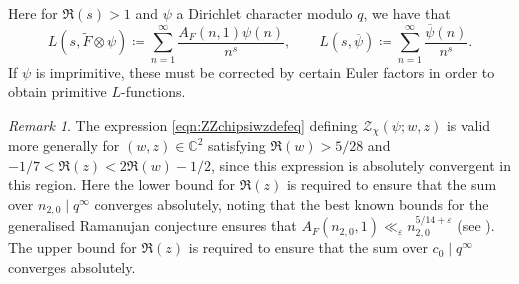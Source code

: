 \documentclass[11pt,a4paper]{amsart}
\newcommand{\C}{\mathbb{C}}
\newcommand{\e}{\varepsilon}
\newcommand{\ZZ}{\mathcal{Z}}
\numberwithin{equation}{section}
\theoremstyle{remark}
\newtheorem{remark}[equation]{Remark}
\theoremstyle{definition}
\begin{document}
Here for $\Re(s) > 1$ and $\psi$ a Dirichlet character modulo $q$, we have that
\[L(s,\widetilde{F} \otimes \psi) \coloneqq \sum_{n = 1}^{\infty} \frac{A_F(n,1) \psi(n)}{n^s}, \qquad L(s,\overline{\psi}) \coloneqq \sum_{n = 1}^{\infty} \frac{\overline{\psi}(n)}{n^s}.\]
If $\psi$ is imprimitive, these must be corrected by certain Euler factors in order to obtain primitive $L$-functions.

\begin{remark}
The expression \eqref{eqn:ZZchipsiwzdefeq} defining $\ZZ_{\chi}(\psi;w,z)$ is valid more generally for $(w,z) \in \C^2$ satisfying $\Re(w) > 5/28$ and $-1/7 < \Re(z) < 2\Re(w) - 1/2$, since this expression is absolutely convergent in this region. Here the lower bound for $\Re(z)$ is required to ensure that the sum over $n_{2,0} \mid q^{\infty}$ converges absolutely, noting that the best known bounds for the generalised Ramanujan conjecture ensures that $A_F(n_{2,0},1) \ll_{\e} n_{2,0}^{5/14 + \e}$ (see \cite{Kim03}). The upper bound for $\Re(z)$ is required to ensure that the sum over $c_0 \mid q^{\infty}$ converges absolutely.
\end{remark}
\end{document}
